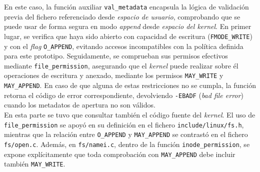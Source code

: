 En este caso, la función auxiliar \verb|val_metadata| encapsula la lógica de validación previa del fichero referenciado desde \textit{espacio de usuario}, comprobando que se puede usar de forma segura en modo \textit{append} desde \textit{espacio del kernel}.
En primer lugar, se verifica que haya sido abierto con capacidad de escritura (\verb|FMODE_WRITE|) y con el \textit{flag} \verb|O_APPEND|, evitando accesos incompatibles con la política definida para este prototipo.
Seguidamente, se comprueban sus permisos efectivos mediante \verb|file_permission|, asegurando que el \textit{kernel} puede realizar sobre él operaciones de escritura y anexado, mediante los permisos \verb|MAY_WRITE| y \verb|MAY_APPEND|.
En caso de que alguna de estas restricciones no se cumpla, la función retorna el código de error correspondiente, devolviendo \texttt{-EBADF} (\textit{bad file error}) cuando los metadatos de apertura no son válidos.\\

En esta parte se tuvo que consultar también el código fuente del \textit{kernel}. El uso de \verb|file_permission| se apoyó en su definición en el fichero \texttt{include/linux/fs.h}, mientras que la relación entre \verb|O_APPEND| y \verb|MAY_APPEND| se contrastó en el fichero \texttt{fs/open.c}.
Además, en \texttt{fs/namei.c}, dentro de la función \verb|inode_permission|, se expone explícitamente que toda comprobación con \verb|MAY_APPEND| debe incluir también \verb|MAY_WRITE|.\\

